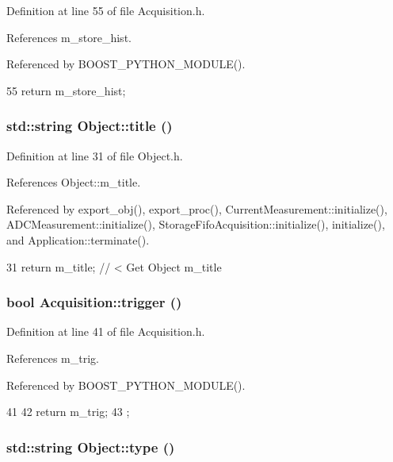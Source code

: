 Definition at line 55 of file Acquisition.h.

References m\_\-store\_\-hist.

Referenced by BOOST\_\-PYTHON\_\-MODULE().


\begin{DoxyCode}
55 {return m_store_hist;}
\end{DoxyCode}
\hypertarget{classObject_a73a0f1a41828fdd8303dd662446fb6c3}{
\subsubsection[{title}]{\setlength{\rightskip}{0pt plus 5cm}std::string Object::title ()}}
\label{classObject_a73a0f1a41828fdd8303dd662446fb6c3}


Definition at line 31 of file Object.h.

References Object::m\_\-title.

Referenced by export\_\-obj(), export\_\-proc(), CurrentMeasurement::initialize(), ADCMeasurement::initialize(), StorageFifoAcquisition::initialize(), initialize(), and Application::terminate().


\begin{DoxyCode}
31 { return m_title;      } // < Get Object m_title
\end{DoxyCode}
\hypertarget{classAcquisition_a6f680938eb6a42d57dfa7466e8852af9}{
\subsubsection[{trigger}]{\setlength{\rightskip}{0pt plus 5cm}bool Acquisition::trigger ()}}
\label{classAcquisition_a6f680938eb6a42d57dfa7466e8852af9}


Definition at line 41 of file Acquisition.h.

References m\_\-trig.

Referenced by BOOST\_\-PYTHON\_\-MODULE().


\begin{DoxyCode}
41                  {
42     return m_trig;
43   };
\end{DoxyCode}
\hypertarget{classObject_a84f99f70f144a83e1582d1d0f84e4e62}{
\subsubsection[{type}]{\setlength{\rightskip}{0pt plus 5cm}std::string Object::type ()}}
\label{classObject_a84f99f70f144a83e1582d1d0f84e4e62}


